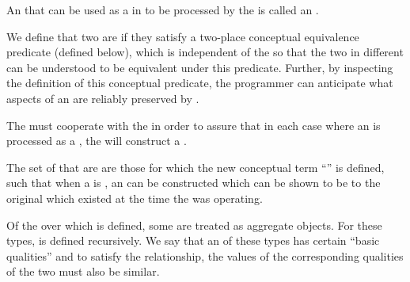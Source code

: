An  that can be used as a   
in  to be processed by the  is called an
.

We define that two  are  if they satisfy
a two-place conceptual equivalence predicate (defined below), which is
independent of the  so that the two  in
different  can be understood to be equivalent under
this predicate.  Further, by inspecting the definition of this conceptual
predicate, the programmer can anticipate what aspects of an 
are reliably preserved by .

The  must cooperate with the  in order to
assure that in each case where an  is processed
as a , the  will construct a 
.

The set of  that are  are those
for which the new conceptual term ``'' is defined, such that
when a  is , an  can be constructed
which can be shown to be  to the original  which
existed at the time the  was operating.

\endsubsubsection%



Of the  over which  is defined, 
some are treated as aggregate objects.  For these types, 
 is defined recursively.  
We say that an  of these types has certain ``basic qualities''
and to satisfy the  relationship, the values of the
corresponding qualities of the two  must also be similar.
 
\endsubsubsubsection%

